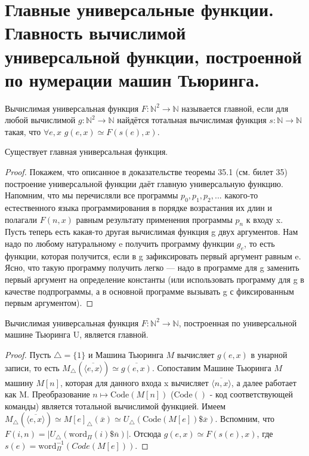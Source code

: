 \section{Главные универсальные функции. Главность вычислимой универсальной функции, построенной по нумерации машин
Тьюринга.}

\begin{definition}
	Вычислимая универсальная функция $F:\mathbb{N}^2 \rightarrow \mathbb{N}$ называется главной, если для любой
	вычислимой $g:\mathbb{N}^2 \rightarrow \mathbb{N}$ найдётся тотальная вычислимая функция $s:\mathbb{N}
	\rightarrow \mathbb{N}$ такая, что $\forall e,x$ $g(e,x) \simeq F(s(e),x)$.
\end{definition}

\begin{theorem}
	Существует главная универсальная функция.
\end{theorem}
\begin{proof}
	Покажем, что описанное в доказательстве теоремы 35.1 (см. билет 35) построение универсальной функции даёт
	главную универсальную функцию. Напомним, что мы перечисляли все программы $p_0, p_1, p_2,...$ какого-то
	естественного языка программирования в порядке возрастания их длин и полагали $F(n,x)$ равным результату
	применения программы $p_n$ к входу x. Пусть теперь есть какая-то другая вычислимая функция g двух аргументов.
	Нам надо по любому натуральному e получить программу функции $g_e$, то есть функции, которая получится, если в
	g зафиксировать первый аргумент равным e. Ясно, что такую программу получить легко — надо в программе для g
	заменить первый аргумент на определение константы (или использовать программу для g в качестве подпрограммы, а
	в основной программе вызывать g с фиксированным первым аргументом).
\end{proof}

\begin{theorem}
	Вычислимая универсальная функция $F:\mathbb{N}^2 \rightarrow \mathbb{N}$, построенная по универсальной машине
	Тьюринга U, является главной.
\end{theorem}
\begin{proof}
	Пусть $\bigtriangleup = \{1\}$ и Машина Тьюринга $M$ вычисляет $g(e,x)$ в унарной записи, то есть
	$M_\bigtriangleup (\overline{\langle e,x \rangle}) \simeq \overline{g(e,x)}$. Сопоставим Машине Тьюринга $M$
	машину $M[n]$, которая для данного входа x вычисляет $\overline{\langle n,x \rangle}$, а далее работает как M.
	Преобразование $n\mapsto\mathrm{Code}(M[n])$ ($\mathrm{Code}()$ - код соответствующей команды) является
	тотальной вычислимой функцией. Имеем $M_\bigtriangleup (\overline{\langle e,x \rangle}) \simeq
	M[e]_\bigtriangleup (\overline{x}) \simeq U_\bigtriangleup (\mathrm{Code}(M[e]) \$ \overline{x}) $. Вспомним,
	что $F(i,n) = |U_\bigtriangleup (\mathrm{word}_{\Pi} (i) \$ \overline{n})|$. Отсюда $g(e,x) \simeq F(s(e),x)$,
	где $s(e) = \mathrm{word}_{\Pi}^{-1} (Code(M[e])) $.

\end{proof}
